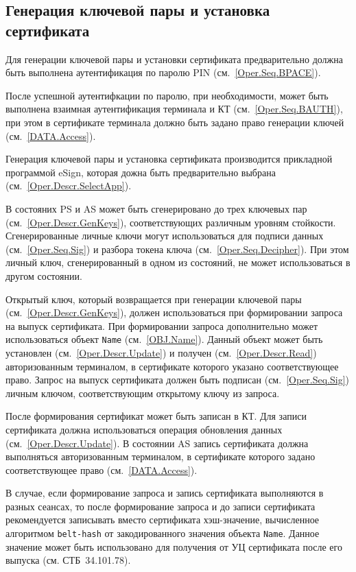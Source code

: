 \subsection{Генерация ключевой пары и установка сертификата}
\label{Oper.Seq.GeKeySetCert}

Для генерации ключевой пары и 
установки сертификата предварительно 
должна быть выполнена аутентификация по 
паролю PIN (см.~\ref{Oper.Seq.BPACE}).

После успешной аутентифкации по паролю,
при необходимости, может быть выполнена взаимная 
аутентификация терминала и КТ (см.~\ref{Oper.Seq.BAUTH}),
при этом в сертификате терминала должно быть задано
право генерации ключей (см.~\ref{DATA.Access}).

Генерация ключевой пары и установка сертификата производится 
прикладной программой eSign, которая дожна быть предварительно 
выбрана (см.~\ref{Oper.Descr.SelectApp}). 

В состояних PS и AS может быть сгенерировано
до трех ключевых пар (см.~\ref{Oper.Descr.GenKeys}), 
соответствующих различным уровням стойкости. 
Сгенерированные личные ключи могут использоваться
для подписи данных (см.~\ref{Oper.Seq.Sig}) и разбора токена 
ключа (см.~\ref{Oper.Seq.Decipher}).
При этом личный ключ, сгенерированный в одном из состояний, 
не может использоваться в другом состоянии. 

Открытый ключ, который возвращается при генерации ключевой пары
(см.~\ref{Oper.Descr.GenKeys}), должен использоваться при формировании 
запроса на выпуск сертификата.
При формировании запроса дополнительно может использоваться 
объект \texttt{Name} (см.~\ref{OBJ.Name}). 
Данный объект может быть установлен (см.~\ref{Oper.Descr.Update}) 
и получен (см.~\ref{Oper.Descr.Read})
авторизованным терминалом, в сертификате которого указано 
соответствующее право.
\fi
Запрос на выпуск сертификата должен быть подписан (см.~\ref{Oper.Seq.Sig})
личным ключом, соответствующим открытому ключу из запроса.

После формирования сертификат может быть записан в КТ.
Для записи сертификата должна использоваться операция 
обновления данных (см.~\ref{Oper.Descr.Update}). 
В состоянии AS запись сертификата должна выполняться 
авторизованным терминалом, в сертификате которого задано 
соответствующее право (см.~\ref{DATA.Access}). 

В случае, если формирование запроса и запись сертификата
выполняются в разных сеансах, то 
после формирование запроса и до записи сертификата 
рекомендуется записывать вместо сертификата 
хэш-значение, вычисленное алгоритмом \texttt{belt-hash} 
от закодированного значения объекта \texttt{Name}.
Данное значение может быть использовано для получения от УЦ
сертификата после его выпуска (см. СТБ~34.101.78).

